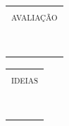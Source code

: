 {\begin{table}[b!]
    \begin{minipage}{.5\linewidth}
      \centering
        \begin{tabularx}{0.99\textwidth}{|Y|}
\hline
\textsc{avaliação} \\ 
 \\
 \\
 \\
 \\
 \\
 \\
 \\ \hline
        \end{tabularx}
    \end{minipage}%
    \begin{minipage}{.5\linewidth}
      \centering
        \begin{tabularx}{0.99\textwidth}{|Y|}
\hline
\textsc{ideias} \\
 \\
 \\
 \\
 \\
 \\
 \\
 \\ \hline
        \end{tabularx}
    \end{minipage} 
\end{table}
}


\newcommand{\WritingLines}{%
\begin{figure}[b!]
  \parbox[t][\paperheight]{\paperwidth}{
    \begin{tikzpicture}[overlay]
      \foreach \i in {-0.41, -1.01, ..., -19.5}{\draw [gray, thin]
        (-3cm,\i) -- (16cm,\i);}
    \end{tikzpicture}}
\end{figure}
}

